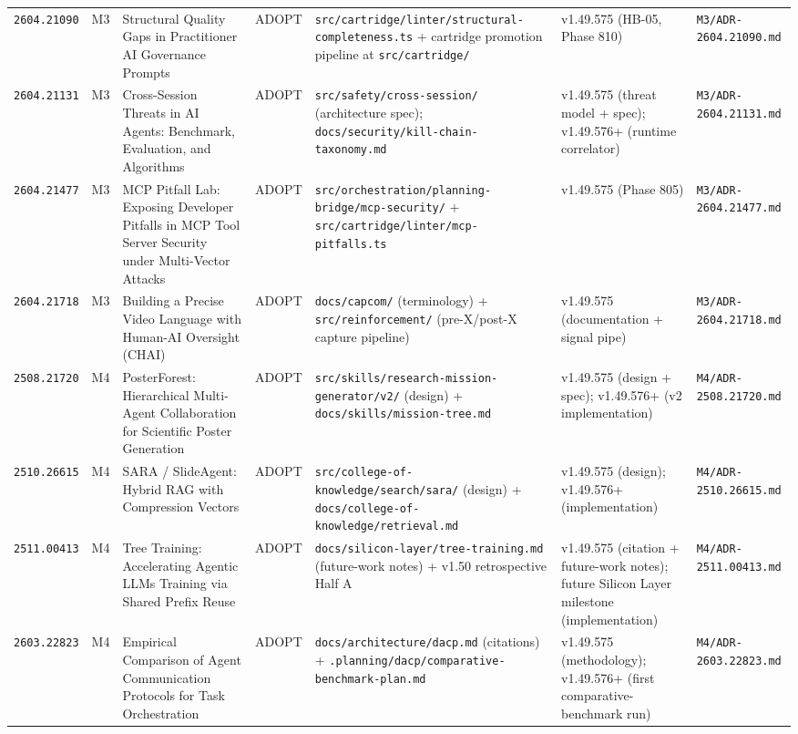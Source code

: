 \documentclass[11pt,letterpaper]{article}
\newcommand{\arxivid}[1]{\texttt{\textcolor{accent}{#1}}}
\begin{document}
\begin{footnotesize}
\begin{longtable}{@{}L{0.10\textwidth} L{0.025\textwidth} L{0.22\textwidth} L{0.06\textwidth} L{0.20\textwidth} L{0.13\textwidth} L{0.13\textwidth}@{}}
\arxivid{2604.21090} & M3 & Structural Quality Gaps in Practitioner AI Governance Prompts & ADOPT & \texttt{src/cartridge/linter/structural-completeness.ts} + cartridge promotion pipeline at \texttt{src/cartridge/} & v1.49.575 (HB-05, Phase 810) & \texttt{\small M3/ADR-2604.21090.md} \\
\arxivid{2604.21131} & M3 & Cross-Session Threats in AI Agents: Benchmark, Evaluation, and Algorithms & ADOPT & \texttt{src/safety/cross-session/} (architecture spec); \texttt{docs/security/kill-chain-taxonomy.md} & v1.49.575 (threat model + spec); v1.49.576+ (runtime correlator) & \texttt{\small M3/ADR-2604.21131.md} \\
\arxivid{2604.21477} & M3 & MCP Pitfall Lab: Exposing Developer Pitfalls in MCP Tool Server Security under Multi-Vector Attacks & ADOPT & \texttt{src/orchestration/planning-bridge/mcp-security/} + \texttt{src/cartridge/linter/mcp-pitfalls.ts} & v1.49.575 (Phase 805) & \texttt{\small M3/ADR-2604.21477.md} \\
\arxivid{2604.21718} & M3 & Building a Precise Video Language with Human-AI Oversight (CHAI) & ADOPT & \texttt{docs/capcom/} (terminology) + \texttt{src/reinforcement/} (pre-X/post-X capture pipeline) & v1.49.575 (documentation + signal pipe) & \texttt{\small M3/ADR-2604.21718.md} \\
\arxivid{2508.21720} & M4 & PosterForest: Hierarchical Multi-Agent Collaboration for Scientific Poster Generation & ADOPT & \texttt{src/skills/research-mission-generator/v2/} (design) + \texttt{docs/skills/mission-tree.md} & v1.49.575 (design + spec); v1.49.576+ (v2 implementation) & \texttt{\small M4/ADR-2508.21720.md} \\
\arxivid{2510.26615} & M4 & SARA / SlideAgent: Hybrid RAG with Compression Vectors & ADOPT & \texttt{src/college-of-knowledge/search/sara/} (design) + \texttt{docs/college-of-knowledge/retrieval.md} & v1.49.575 (design); v1.49.576+ (implementation) & \texttt{\small M4/ADR-2510.26615.md} \\
\arxivid{2511.00413} & M4 & Tree Training: Accelerating Agentic LLMs Training via Shared Prefix Reuse & ADOPT & \texttt{docs/silicon-layer/tree-training.md} (future-work notes) + v1.50 retrospective Half A & v1.49.575 (citation + future-work notes); future Silicon Layer milestone (implementation) & \texttt{\small M4/ADR-2511.00413.md} \\
\arxivid{2603.22823} & M4 & Empirical Comparison of Agent Communication Protocols for Task Orchestration & ADOPT & \texttt{docs/architecture/dacp.md} (citations) + \texttt{.planning/dacp/comparative-benchmark-plan.md} & v1.49.575 (methodology); v1.49.576+ (first comparative-benchmark run) & \texttt{\small M4/ADR-2603.22823.md} \\

\end{longtable}
\end{footnotesize}
\end{document}
